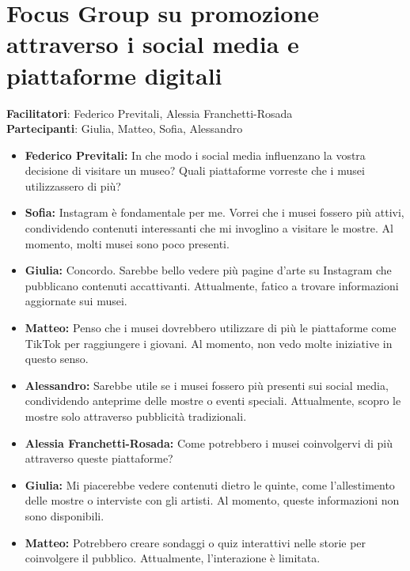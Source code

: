 \documentclass{article}
\begin{document}
\section{Focus Group su promozione attraverso i social media e \\ piattaforme digitali}
\textbf{Facilitatori}: Federico Previtali, Alessia Franchetti-Rosada \\
\textbf{Partecipanti}: Giulia, Matteo, Sofia, Alessandro

\begin{itemize}
\item \textbf{Federico Previtali:} In che modo i social media influenzano la vostra decisione di visitare un museo? Quali piattaforme vorreste che i musei utilizzassero di più?

\item \textbf{Sofia:} Instagram è fondamentale per me. Vorrei che i musei fossero più attivi, condividendo contenuti interessanti che mi invoglino a visitare le mostre. Al momento, molti musei sono poco presenti.

\item \textbf{Giulia:} Concordo. Sarebbe bello vedere più pagine d’arte su Instagram che pubblicano contenuti accattivanti. Attualmente, fatico a trovare informazioni aggiornate sui musei.

\item \textbf{Matteo:} Penso che i musei dovrebbero utilizzare di più le piattaforme come TikTok per raggiungere i giovani. Al momento, non vedo molte iniziative in questo senso.

\item \textbf{Alessandro:} Sarebbe utile se i musei fossero più presenti sui social media, condividendo anteprime delle mostre o eventi speciali. Attualmente, scopro le mostre solo attraverso pubblicità tradizionali.

\item \textbf{Alessia Franchetti-Rosada:} Come potrebbero i musei coinvolgervi di più attraverso queste piattaforme?

\item \textbf{Giulia:} Mi piacerebbe vedere contenuti dietro le quinte, come l’allestimento delle mostre o interviste con gli artisti. Al momento, queste informazioni non sono disponibili.

\item \textbf{Matteo:} Potrebbero creare sondaggi o quiz interattivi nelle storie per coinvolgere il pubblico. Attualmente, l’interazione è limitata.


\end{itemize}
\end{document}
